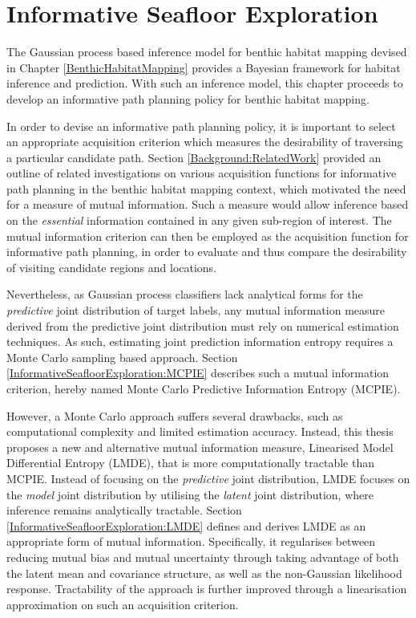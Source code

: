 \chapter{Informative Seafloor Exploration}
\label{InformativeSeafloorExploration}

	The Gaussian process based inference model for benthic habitat mapping devised in Chapter \ref{BenthicHabitatMapping} provides a Bayesian framework for habitat inference and prediction. With such an inference model, this chapter proceeds to develop an informative path planning policy for benthic habitat mapping.
	
	In order to devise an informative path planning policy, it is important to select an appropriate acquisition criterion which measures the desirability of traversing a particular candidate path. Section \ref{Background:RelatedWork} provided an outline of related investigations on various acquisition functions for informative path planning in the benthic habitat mapping context, which motivated the need for a measure of mutual information. Such a measure would allow inference based on the \textit{essential} information contained in any given sub-region of interest. The mutual information criterion can then be employed as the acquisition function for informative path planning, in order to evaluate and thus compare the desirability of visiting candidate regions and locations.
	
	Nevertheless, as Gaussian process classifiers lack analytical forms for the \textit{predictive} joint distribution of target labels, any mutual information measure derived from the predictive joint distribution must rely on numerical estimation techniques. As such, estimating joint prediction information entropy requires a Monte Carlo sampling based approach. Section \ref{InformativeSeafloorExploration:MCPIE} describes such a mutual information criterion, hereby named Monte Carlo Predictive Information Entropy (MCPIE).
	
	However, a Monte Carlo approach suffers several drawbacks, such as computational complexity and limited estimation accuracy. Instead, this thesis proposes a new and alternative mutual information measure, Linearised Model Differential Entropy (LMDE), that is more computationally tractable than MCPIE. Instead of focusing on the \textit{predictive} joint distribution, LMDE focuses on the \textit{model} joint distribution by utilising the \textit{latent} joint distribution, where inference remains analytically tractable. Section \ref{InformativeSeafloorExploration:LMDE} defines and derives LMDE as an appropriate form of mutual information. Specifically, it regularises between reducing mutual bias and mutual uncertainty through taking advantage of both the latent mean and covariance structure, as well as the non-Gaussian likelihood response. Tractability of the approach is further improved through a linearisation approximation on such an acquisition criterion.
	
